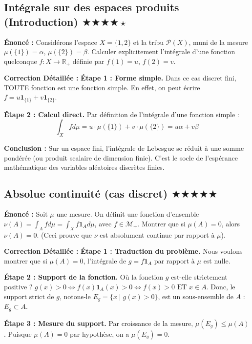 \documentclass[11pt,a4paper]{article}
\begin{document}
\subsection*{Int\'egrale sur des espaces produits (Introduction) \quad $\bigstar\bigstar\bigstar\bigstar\star$}

\textbf{Énonc\'e :}
Consid\'erons l'espace $X = \{1, 2\}$ et la tribu $\mathcal{P}(X)$, muni de la mesure $\mu(\{1\}) = \alpha$, $\mu(\{2\}) = \beta$.
Calculer explicitement l'int\'egrale d'une fonction quelconque $f: X \to \mathbb{R}_+$ d\'efinie par $f(1) = u$, $f(2) = v$.

\textbf{Correction D\'etaill\'ee :}
\textbf{Étape 1 : Forme simple.}
Dans ce cas discret fini, TOUTE fonction est une fonction simple.
En effet, on peut \'ecrire $f = u \mathbf{1}_{\{1\}} + v \mathbf{1}_{\{2\}}$.

\textbf{Étape 2 : Calcul direct.}
Par d\'efinition de l'int\'egrale d'une fonction simple :
$$\int_X f d\mu = u \cdot \mu(\{1\}) + v \cdot \mu(\{2\}) = u\alpha + v\beta$$

\textbf{Conclusion :}
Sur un espace fini, l'int\'egrale de Lebesgue se r\'eduit \`a une somme pond\'er\'ee (ou produit scalaire de dimension finie). C'est le socle de l'esp\'erance math\'ematique des variables al\'eatoires discr\`etes finies.


\subsection*{Absolue continuit\'e (cas discret) \quad $\bigstar\bigstar\bigstar\bigstar\bigstar$}

\textbf{Énonc\'e :}
Soit $\mu$ une mesure. On d\'efinit une fonction d'ensemble $\nu(A) = \int_A f d\mu = \int_X f \mathbf{1}_A d\mu$, avec $f \in \mathcal{M}_+$.
Montrer que si $\mu(A) = 0$, alors $\nu(A) = 0$. (Ceci prouve que $\nu$ est absolument continue par rapport \`a $\mu$).

\textbf{Correction D\'etaill\'ee :}
\textbf{Étape 1 : Traduction du probl\`eme.}
Nous voulons montrer que si $\mu(A) = 0$, l'int\'egrale de $g = f \mathbf{1}_A$ par rapport \`a $\mu$ est nulle.

\textbf{Étape 2 : Support de la fonction.}
Où la fonction $g$ est-elle strictement positive ?
$g(x) > 0 \iff f(x) \mathbf{1}_A(x) > 0 \iff f(x) > 0 \text{ ET } x \in A$.
Donc, le support strict de $g$, notons-le $E_g = \{x \mid g(x) > 0\}$, est un sous-ensemble de $A$ : $E_g \subset A$.

\textbf{Étape 3 : Mesure du support.}
Par croissance de la mesure, $\mu(E_g) \le \mu(A)$.
Puisque $\mu(A) = 0$ par hypoth\`ese, on a $\mu(E_g) = 0$.
\end{document}
